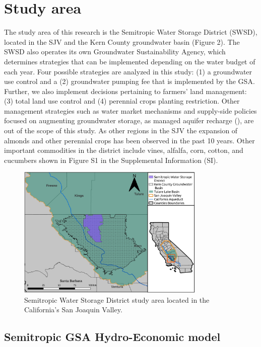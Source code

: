 \documentclass[11pt,a4paper]{article}
\begin{document}
\section{Study area}


The study area of this research is the Semitropic Water Storage District (SWSD), located in the SJV and the Kern County groundwater basin (Figure 2). The SWSD also operates its own Groundwater Sustainability Agency, which  determines strategies that can be implemented depending on the water budget of each year. Four possible strategies are analyzed in this study: (1) a groundwater use control and a (2) groundwater pumping fee that is implemented by the GSA. Further, we also implement decisions pertaining to farmers’ land management: (3) total land use control and (4) perennial crops planting restriction. Other management strategies such as water market mechanisms and supply-side policies focused on augmenting groundwater storage, as managed aquifer recharge (\cite{ulibarri_assessing_2021}), are out of the scope of this study. As other regions in the SJV the expansion of almonds and other perennial crops has been observed in the past 10 years. Other important commodities in the district include vines, alfalfa, corn, cotton, and cucumbers shown in Figure S1 in the Supplemental Information (SI). 
  

\begin{figure}[H]
    \centering
    \includegraphics[width=0.8\textwidth]{Map_Semitropic.jpg}
    \caption{Semitropic Water Storage District study area located in the California’s San Joaquin Valley.}
    \label{fig:1}
\end{figure}

\subsection{Semitropic GSA Hydro-Economic model}
\end{document}
